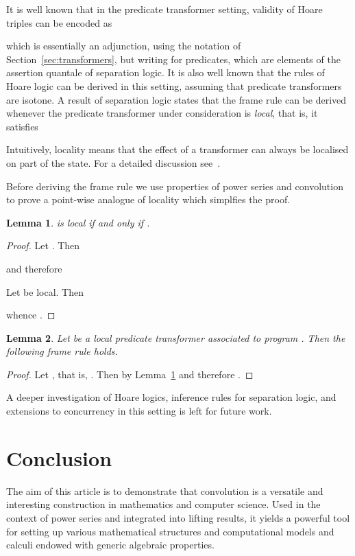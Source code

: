 \documentclass[12pt]{article}
\newtheorem{lemma}{Lemma}
\theoremstyle{definition}
\begin{document}
It is well known that in the predicate transformer setting, validity
of Hoare triples can be encoded as

which is essentially an adjunction, using the notation of Section~\ref{sec:transformers},
but writing  for predicates, which are elements of the
assertion quantale of separation logic. It is also well known that the
rules of Hoare logic can be derived in this setting, assuming that
predicate transformers are isotone. A result of separation logic
states that the frame rule can be derived whenever the predicate
transformer  under consideration is \emph{local}, that is, it
satisfies

Intuitively, locality means that the effect of a transformer can
always be localised on part of the state. For a detailed discussion
see~\cite{COY07}.

Before deriving the frame rule we use properties of power series and
convolution to prove a point-wise analogue of locality which simplfies
the proof.
\begin{lemma}\label{lem:local-prop}
   is local if and only if .
\end{lemma}
\begin{proof}
  Let . Then 

 and therefore 


Let  be local.  Then 

 whence .
\end{proof}

\begin{lemma}
  Let  be a local predicate transformer associated to program
  . Then the following frame rule holds.
  
\end{lemma}
\begin{proof} 
  Let , that is, . Then  by
  Lemma~\ref{lem:local-prop} and therefore .
\end{proof}
A deeper investigation of Hoare logics, inference rules for separation
logic, and extensions to concurrency in this setting is left for
future work.



\section{Conclusion}\label{sec:conclusion}

The aim of this article is to demonstrate that convolution is a
versatile and interesting construction in mathematics and computer
science.  Used in the context of power series and integrated into
lifting results, it yields a powerful tool for setting up various
mathematical structures and computational models and calculi endowed
with generic algebraic properties.
\end{document}
